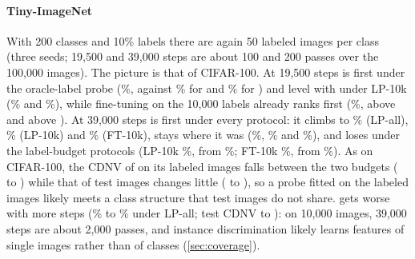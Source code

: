 \paragraph{Tiny-ImageNet}
With 200 classes and 10\% labels there are again 50 labeled images per class (three seeds; 19,500 and 39,000
steps are about 100 and 200 passes over the 100,000 images). The picture is that of CIFAR-100. At 19,500 steps
\union is first under the oracle-label probe (\%, against \% for
\simclr and \% for \supcon) and level with \simclr under LP-10k
(\% and \%), while fine-tuning on the 10,000 labels already ranks
\simclr first (\%, \pt above \union and
\pt above \supcon). At 39,000 steps \simclr is first under every protocol: it climbs to
\% (LP-all), \% (LP-10k) and \% (FT-10k),
\supcon stays where it was (\%, \% and
\%), and \union loses under the label-budget protocols (LP-10k
\%, from \%; FT-10k \%, from
\%). As on CIFAR-100, the CDNV of \union on its labeled images falls between the two
budgets ( to ) while that of test images changes little
( to ), so a probe fitted on the labeled images likely
meets a class structure that test images do not share. \simclrsub gets worse with more steps
(\% to \% under LP-all; test CDNV
 to ): on 10,000 images, 39,000 steps are about
2,000 passes, and instance discrimination likely learns features of single images rather than of classes
(\cref{sec:coverage}).

